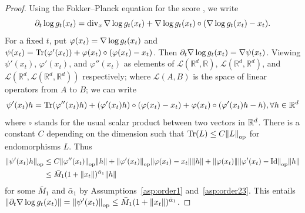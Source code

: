 \documentclass{article}
\theoremstyle{plain}
\theoremstyle{definition}
\theoremstyle{remark}
\begin{document}
\begin{proof}
	Using the Fokker--Planck equation for the score \citep{lai2022regularizing}, we write
	\begin{equation*}
		\partial_t \log g_t(x_t) = \operatorname{div}_x \nabla\log g_t(x_t) + \nabla\log g_t(x_t) \circ (\nabla\log g_t(x_t)-x_t).
	\end{equation*}
	For a fixed $t$, put $\varphi(x_t) = \nabla\log g_t(x_t)$ and $\psi(x_t)=\Tr(\varphi'(x_t)) + \varphi(x_t) \circ (\varphi(x_t) - x_t)$. Then $\partial_t \nabla\log g_t(x_t) = \nabla\psi(x_t)$. Viewing $\psi'(x_t)$, $\varphi'(x_t)$, and $\varphi''(x_t)$ as elements of $\mathcal L(\mathbb R^d, \mathbb R)$, $\mathcal L(\mathbb R^d, \mathbb R^d)$, and $\mathcal L(\mathbb R^d, \mathcal L(\mathbb R^d, \mathbb R^d))$ respectively; where $\mathcal L(A,B)$ is the space of linear operators from $A$ to $B$; we can write
	\begin{equation*}
		\psi'(x_t)h = \Tr(\varphi''(x_t)h) + (\varphi'(x_t)h)\circ(\varphi(x_t)-x_t) + \varphi(x_t)\circ(\varphi'(x_t)h-h), \forall h \in \mathbb R^d
	\end{equation*}
	where $\circ$ stands for the usual scalar product between two vectors in $\mathbb{R}^d$.
	There is a constant $C$ depending on the dimension such that $\Tr(L) \leq C\norm{L}_{\operatorname{op}}$ for endomorphisms $L$. Thus
	\begin{align*}
		\norm{\psi'(x_t)h}_{\operatorname{op}} & \leq C\norm{\varphi''(x_t)}_{\operatorname{op}} \norm{h} + \norm{\varphi'(x_t)}_{\operatorname{op}} \norm{\varphi(x_t)-x_t} \norm{h} + \norm{\varphi(x_t)} \norm{\varphi'(x_t)-\operatorname{Id}}_{\operatorname{op}} \norm{h} \\
		                     & \leq \bar M_1(1+\norm{x_t})^{\bar \alpha_1} \norm{h}
	\end{align*}
	for some $\bar M_1$ and $\bar \alpha_1$ by Assumptions~\ref{asp:order1} and~\ref{asp:order23}. This entails $\norm{\partial_t \nabla\log g_t(x_t)} = \norm{\psi'(x_t)}_{\operatorname{op}} \leq \bar M_1(1+\norm{x_t})^{\bar \alpha_1}$.
\end{proof}
\end{document}
